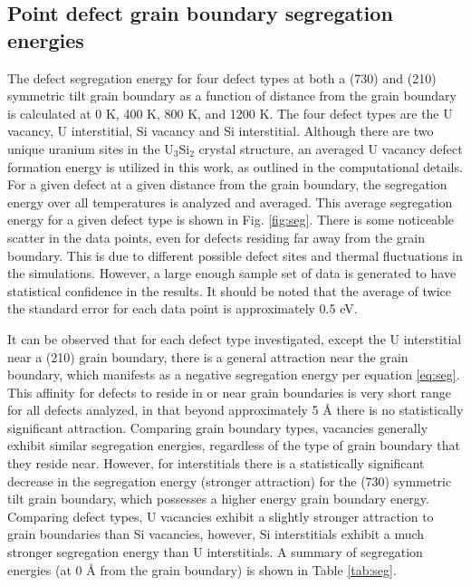 \documentclass[review]{elsarticle}
\begin{document}
\FloatBarrier

\subsection{Point defect grain boundary segregation energies}

The defect segregation energy for four defect types at both a (730) and (210) symmetric tilt grain boundary as a function of distance from the grain boundary is calculated at 0 K, 400 K, 800 K, and 1200 K. The four defect types are the U vacancy, U interstitial, Si vacancy and Si interstitial. Although there are two unique uranium sites in the U$_{3}$Si$_{2}$ crystal structure, an averaged U vacancy defect formation energy is utilized in this work, as outlined in the computational details. For a given defect at a given distance from the grain boundary, the segregation energy over all temperatures is analyzed and averaged. This average segregation energy for a given defect type is shown in Fig. \ref{fig:seg}. There is some noticeable scatter in the data points, even for defects residing far away from the grain boundary. This is due to different possible defect sites and thermal fluctuations in the simulations. However, a large enough sample set of data is generated to have statistical confidence in the results. It should be noted that the average of twice the standard error for each data point is approximately 0.5 eV. 


It can be observed that for each defect type investigated, except the U interstitial near a (210) grain boundary, there is a general attraction near the grain boundary, which manifests as a negative segregation energy per equation \ref{eq:seg}. This affinity for defects to reside in or near grain boundaries is very short range for all defects analyzed, in that beyond approximately 5 {\AA} there is no statistically significant attraction. Comparing grain boundary types, vacancies generally exhibit similar segregation energies, regardless of the type of grain boundary that they reside near. However, for interstitials there is a statistically significant decrease in the segregation energy (stronger attraction) for the (730) symmetric tilt grain boundary, which possesses a higher energy grain boundary energy. Comparing defect types, U vacancies exhibit a slightly stronger attraction to grain boundaries than Si vacancies, however, Si interstitials exhibit a much stronger segregation energy than U interstitials. A summary of segregation energies (at 0 {\AA} from the grain boundary) is shown in Table \ref{tab:seg}. 
 
\end{document}

